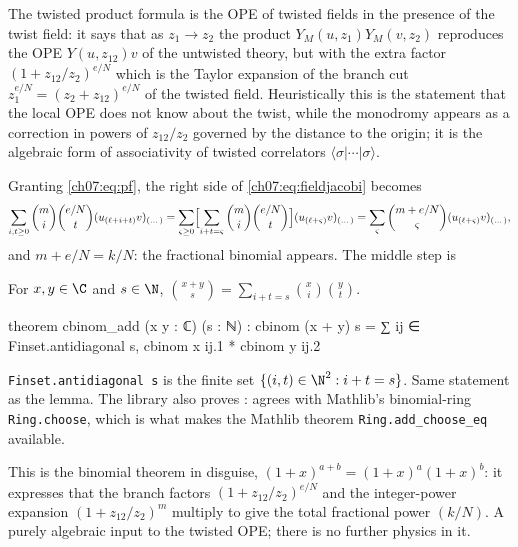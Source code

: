 \begin{physics}
The twisted product formula is the OPE of twisted fields in the presence of the twist field: it says that as $z_1\to z_2$ the product $Y_M(u,z_1)Y_M(v,z_2)$ reproduces the OPE $Y(u,z_{12})v$ of the untwisted theory, but with the extra factor $(1+z_{12}/z_2)^{e/N}$ which is the Taylor expansion of the branch cut $z_1^{e/N}=(z_2+z_{12})^{e/N}$ of the twisted field. Heuristically this is the statement that the local OPE does not know about the twist, while the monodromy appears as a correction in powers of $z_{12}/z_2$ governed by the distance to the origin; it is the algebraic form of associativity of twisted correlators $\langle\sigma|\cdots|\sigma\rangle$.
\end{physics}

\noindent Granting \eqref{ch07:eq:pf}, the right side of \eqref{ch07:eq:fieldjacobi} becomes
\begin{equation*}
  \sum_{i,t\ge0}\binom mi\binom{e/N}{t}(u_{(\ell+i+t)}v)_{(\dots)} = \sum_{\varsigma\ge0}
  \Bigl[\sum_{i+t=\varsigma}\binom mi\binom{e/N}t\Bigr](u_{(\ell+\varsigma)}v)_{(\dots)}
  = \sum_{\varsigma}\binom{m+e/N}{\varsigma}(u_{(\ell+\varsigma)}v)_{(\dots)},
\end{equation*}
and $m+e/N = k/N$: the fractional binomial appears. The middle step is

\begin{lemma}\label{ch07:lem:vandermonde}
For $x,y\in\C$ and $s\in\N$, $\binom{x+y}{s} = \sum_{i+t=s}\binom xi\binom yt$.
\end{lemma}

\begin{leancode}
theorem cbinom_add (x y : ℂ) (s : ℕ) :
    cbinom (x + y) s = ∑ ij ∈ Finset.antidiagonal s, cbinom x ij.1 * cbinom y ij.2
\end{leancode}

\begin{dictionary}
\verb|Finset.antidiagonal s| is the finite set $\{(i,t)\in\N^2: i+t=s\}$. Same statement as the
lemma. The library also proves :  agrees with Mathlib's
binomial-ring \verb|Ring.choose|, which is what makes the Mathlib theorem
\verb|Ring.add_choose_eq| available.
\end{dictionary}

\begin{physics}
This is the binomial theorem in disguise, $(1+x)^{a+b}=(1+x)^a(1+x)^b$: it expresses that the branch factors $(1+z_{12}/z_2)^{e/N}$ and the integer-power expansion $(1+z_{12}/z_2)^m$ multiply to give the total fractional power $(k/N)$. A purely algebraic input to the twisted OPE; there is no further physics in it.
\end{physics}

